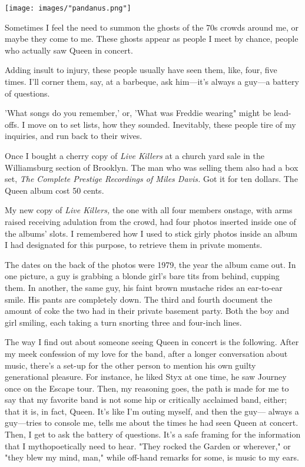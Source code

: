 \documentclass[
]{memoir}
\begin{document}
\begin{center}\texttt{[image: images/"pandanus.png"]}\end{center}

Sometimes I feel the need to summon the ghosts of the 70s crowds around
me, or maybe they come to me. These ghosts appear as people I meet by
chance, people who actually saw Queen in concert.

Adding insult to injury, these people usually have seen them, like,
four, five times. I'll corner them, say, at a barbeque, ask him---it's
always a guy---a battery of questions.

'What songs do you remember,' or, 'What was Freddie wearing" might be
lead-offs. I move on to set lists, how they sounded. Inevitably, these
people tire of my inquiries, and run back to their wives.

Once I bought a cherry copy of \emph{Live Killers} at a church yard sale
in the Williamsburg section of Brooklyn. The man who was selling them
also had a box set, \emph{The Complete Prestige Recordings of Miles
Davis.} Got it for ten dollars. The Queen album cost 50 cents.

My new copy of \emph{Live Killers,} the one with all four members
onstage, with arms raised receiving adulation from the crowd, had four
photos inserted inside one of the albums' slots. I remembered how I used
to stick girly photos inside an album I had designated for this purpose,
to retrieve them in private moments.

The dates on the back of the photos were 1979, the year the album came
out. In one picture, a guy is grabbing a blonde girl's bare tits from
behind, cupping them. In another, the same guy, his faint brown mustache
rides an ear-to-ear smile. His pants are completely down. The third and
fourth document the amount of coke the two had in their private basement
party. Both the boy and girl smiling, each taking a turn snorting three
and four-inch lines.

The way I find out about someone seeing Queen in concert is the
following. After my meek confession of my love for the band, after a
longer conversation about music, there's a set-up for the other person
to mention his own guilty generational pleasure. For instance, he liked
Styx at one time, he saw Journey once on the Escape tour. Then, my
reasoning goes, the path is made for me to say that my favorite band is
not some hip or critically acclaimed band, either; that it is, in fact,
Queen. It's like I'm outing myself, and then the guy--- always a
guy---tries to console me, tells me about the times he had seen Queen at
concert. Then, I get to ask the battery of questions. It's a safe
framing for the information that I mythopoetically need to hear. "They
rocked the Garden or wherever," or "they blew my mind, man," while
off-hand remarks for some, is music to my ears.
\end{document}
